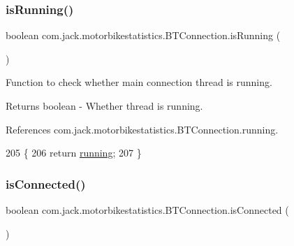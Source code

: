 \mbox{\label{classcom_1_1jack_1_1motorbikestatistics_1_1_b_t_connection_a17b07494b0e7cba2e550054d7b47e309}} 
\subsubsection{\texorpdfstring{is\+Running()}{isRunning()}}
{\footnotesize\ttfamily boolean com.\+jack.\+motorbikestatistics.\+B\+T\+Connection.\+is\+Running (\begin{DoxyParamCaption}{ }\end{DoxyParamCaption})\hspace{0.3cm}{\ttfamily [inline]}}



Function to check whether main connection thread is running. 

\begin{DoxyReturn}{Returns}
boolean -\/ Whether thread is running. 
\end{DoxyReturn}


References com.\+jack.\+motorbikestatistics.\+B\+T\+Connection.\+running.


\begin{DoxyCode}
205                                \{
206         \textcolor{keywordflow}{return} \hyperlink{classcom_1_1jack_1_1motorbikestatistics_1_1_b_t_connection_a6193b7b92b7f2905a3a43d63db40aba8}{running};
207     \}
\end{DoxyCode}
\mbox{\label{classcom_1_1jack_1_1motorbikestatistics_1_1_b_t_connection_a22f33e46d9f460d78865d4c63b645357}} 
\subsubsection{\texorpdfstring{is\+Connected()}{isConnected()}}
{\footnotesize\ttfamily boolean com.\+jack.\+motorbikestatistics.\+B\+T\+Connection.\+is\+Connected (\begin{DoxyParamCaption}{ }\end{DoxyParamCaption})\hspace{0.3cm}{\ttfamily [inline]}}



